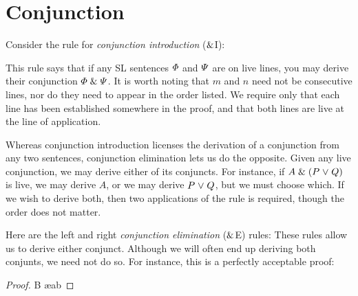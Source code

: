 \section{Conjunction}

Consider the rule for \textit{conjunction introduction} ($\mathrel\&$I):


This rule says that if any SL sentences $\varPhi$ and $\varPsi$ are on live lines, you may derive their conjunction $\varPhi \mathrel\& \varPsi$.
It is worth noting that $m$ and $n$ need not be consecutive lines, nor do they need to appear in the order listed.
We require only that each line has been established somewhere in the proof, and that both lines are live at the line of application.

Whereas conjunction introduction licenses the derivation of a conjunction from any two sentences, conjunction elimination lets us do the opposite.
Given any live conjunction, we may derive either of its conjuncts.
For instance, if $A \mathrel\& (P \mkern1mu\vee\mkern1mu Q)$ is live, we may derive $A$, or we may derive $P \mkern1mu\vee\mkern1mu Q$, but we must choose which.
If we wish to derive both, then two applications of the rule is required, though the order does not matter.

Here are the left and right \textit{conjunction elimination} ($\mathrel\&$E) rules:
These rules allow us to derive either conjunct.
Although we will often end up deriving both conjunts, we need not do so.
For instance, this is a perfectly acceptable proof:

\begin{proof}
	 \pr{}
	B \ae{ab}
\end{proof}

